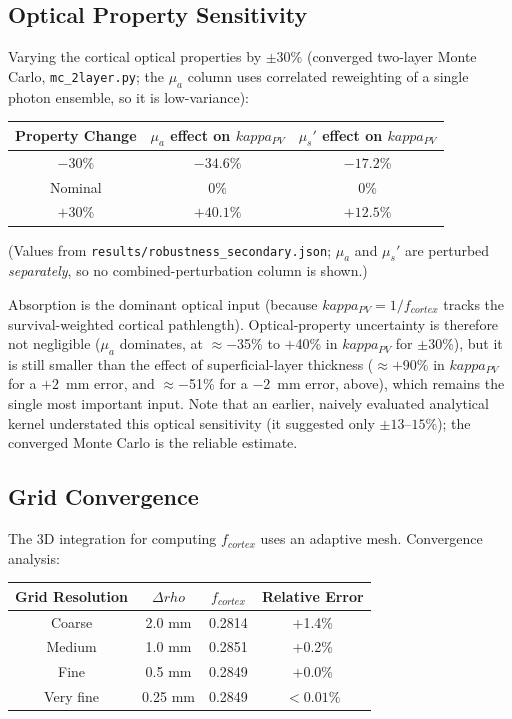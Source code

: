 \documentclass[12pt]{article}
\def\kappa{kappa}%
\def\rho{rho}%
\def\text#1{#1}%
\begin{document}
\subsection{Optical Property Sensitivity}

Varying the cortical optical properties by $\pm 30\%$ (converged two-layer Monte Carlo, \texttt{mc\_2layer.py}; the $\mu_a$ column uses correlated reweighting of a single photon ensemble, so it is low-variance):

\begin{center}
\begin{tabular}{ccc}
\hline
\textbf{Property Change} & $\mu_a$ effect on $\kappa_{\text{PV}}$ & $\mu_s'$ effect on $\kappa_{\text{PV}}$ \\
\hline
$-30\%$ & $-34.6\%$ & $-17.2\%$ \\
Nominal & 0\% & 0\% \\
$+30\%$ & $+40.1\%$ & $+12.5\%$ \\
\hline
\end{tabular}
\end{center}

\noindent (Values from \texttt{results/robustness\_secondary.json}; $\mu_a$ and $\mu_s'$ are perturbed \emph{separately}, so no combined-perturbation column is shown.)

Absorption is the dominant optical input (because $\kappa_{\text{PV}} = 1/f_{\text{cortex}}$ tracks the survival-weighted cortical pathlength). Optical-property uncertainty is therefore not negligible ($\mu_a$ dominates, at $\approx-$35\% to $+$40\% in $\kappa_{\text{PV}}$ for $\pm$30\%), but it is still smaller than the effect of superficial-layer thickness ($\approx+$90\% in $\kappa_{\text{PV}}$ for a $+2$~mm error, and $\approx-$51\% for a $-2$~mm error, above), which remains the single most important input. Note that an earlier, naively evaluated analytical kernel understated this optical sensitivity (it suggested only $\pm 13$--$15\%$); the converged Monte Carlo is the reliable estimate.

\subsection{Grid Convergence}

The 3D integration for computing $f_{\text{cortex}}$ uses an adaptive mesh. Convergence analysis:

\begin{center}
\begin{tabular}{cccc}
\hline
\textbf{Grid Resolution} & $\Delta\rho$ & $f_{\text{cortex}}$ & Relative Error \\
\hline
Coarse & 2.0 mm & 0.2814 & +1.4\% \\
Medium & 1.0 mm & 0.2851 & +0.2\% \\
Fine & 0.5 mm & 0.2849 & +0.0\% \\
Very fine & 0.25 mm & 0.2849 & $<0.01\%$ \\
\hline
\end{tabular}
\end{center}
\end{document}
